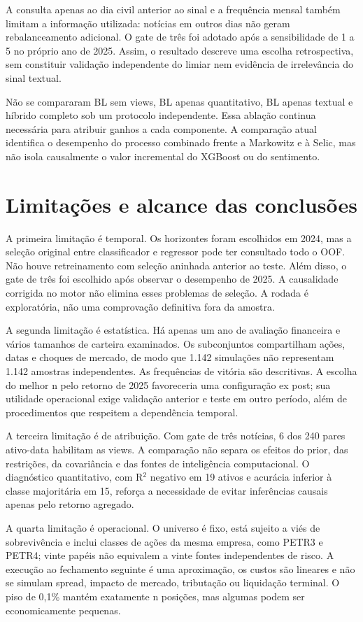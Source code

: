 A consulta apenas ao dia civil anterior ao sinal e a frequência mensal também limitam a informação utilizada: notícias em outros dias não geram rebalanceamento adicional. O gate de três foi adotado após a sensibilidade de 1 a 5 no próprio ano de 2025. Assim, o resultado descreve uma escolha retrospectiva, sem constituir validação independente do limiar nem evidência de irrelevância do sinal textual.

Não se compararam BL sem views, BL apenas quantitativo, BL apenas textual e híbrido completo sob um protocolo independente. Essa ablação continua necessária para atribuir ganhos a cada componente. A comparação atual identifica o desempenho do processo combinado frente a Markowitz e à Selic, mas não isola causalmente o valor incremental do XGBoost ou do sentimento.

\clearpage
\section{Limitações e alcance das conclusões}
A primeira limitação é temporal. Os horizontes foram escolhidos em 2024, mas a seleção original entre classificador e regressor pode ter consultado todo o OOF. Não houve retreinamento com seleção aninhada anterior ao teste. Além disso, o gate de três foi escolhido após observar o desempenho de 2025. A causalidade corrigida no motor não elimina esses problemas de seleção. A rodada é exploratória, não uma comprovação definitiva fora da amostra.

A segunda limitação é estatística. Há apenas um ano de avaliação financeira e vários tamanhos de carteira examinados. Os subconjuntos compartilham ações, datas e choques de mercado, de modo que 1.142 simulações não representam 1.142 amostras independentes. As frequências de vitória são descritivas. A escolha do melhor n pelo retorno de 2025 favoreceria uma configuração ex post; sua utilidade operacional exige validação anterior e teste em outro período, além de procedimentos que respeitem a dependência temporal.

A terceira limitação é de atribuição. Com gate de três notícias, 6 dos 240 pares ativo-data habilitam as views. A comparação não separa os efeitos do prior, das restrições, da covariância e das fontes de inteligência computacional. O diagnóstico quantitativo, com R$^{2}$ negativo em 19 ativos e acurácia inferior à classe majoritária em 15, reforça a necessidade de evitar inferências causais apenas pelo retorno agregado.

A quarta limitação é operacional. O universo é fixo, está sujeito a viés de sobrevivência e inclui classes de ações da mesma empresa, como PETR3 e PETR4; vinte papéis não equivalem a vinte fontes independentes de risco. A execução ao fechamento seguinte é uma aproximação, os custos são lineares e não se simulam spread, impacto de mercado, tributação ou liquidação terminal. O piso de 0,1\% mantém exatamente n posições, mas algumas podem ser economicamente pequenas.

